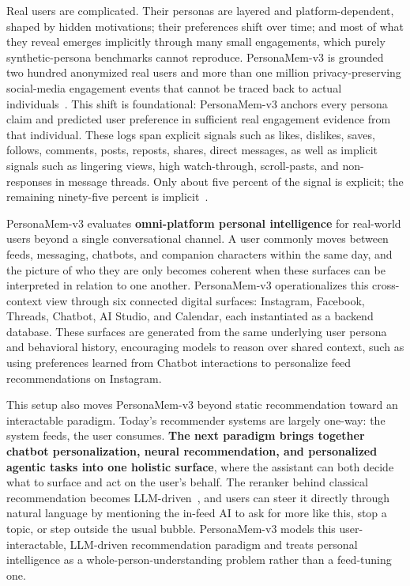 \documentclass[]{fairmeta}
\begin{document}
Real users are complicated. Their personas are layered and platform-dependent, shaped by hidden motivations; their preferences shift over time; and most of what they reveal emerges implicitly through many small engagements, which purely synthetic-persona benchmarks cannot reproduce. PersonaMem-v3 is grounded two hundred anonymized real users and more than one million privacy-preserving social-media engagement events that cannot be traced back to actual individuals~\citep{fostiropoulos2026gistbench}. This shift is foundational: PersonaMem-v3 anchors every persona claim and predicted user preference in sufficient real engagement evidence from that individual. These logs span explicit signals such as likes, dislikes, saves, follows, comments, posts, reposts, shares, direct messages, as well as implicit signals such as lingering views, high watch-through, scroll-pasts, and non-responses in message threads. Only about five percent of the signal is explicit; the remaining ninety-five percent is implicit~\citep{fostiropoulos2026gistbench}.

PersonaMem-v3 evaluates \textbf{omni-platform personal intelligence} for real-world users beyond a single conversational channel. A user commonly moves between feeds, messaging, chatbots, and companion characters within the same day, and the picture of who they are only becomes coherent when these surfaces can be interpreted in relation to one another. PersonaMem-v3 operationalizes this cross-context view through six connected digital surfaces: Instagram, Facebook, Threads, Chatbot, AI Studio, and Calendar, each instantiated as a backend database. These surfaces are generated from the same underlying user persona and behavioral history, encouraging models to reason over shared context, such as using preferences learned from Chatbot interactions to personalize feed recommendations on Instagram. 

This setup also moves PersonaMem-v3 beyond static recommendation toward an interactable paradigm. Today’s recommender systems are largely one-way: the system feeds, the user consumes. \textbf{The next paradigm brings together chatbot personalization, neural recommendation, and personalized agentic tasks into one holistic surface}, where the assistant can both decide what to surface and act on the user’s behalf. The reranker behind classical recommendation becomes LLM-driven~\citep{gao2025llm4rerank, hou2024zeroshotrankers, luo2025recranker, liu2026generating, wang2025userfeedbackalignment, wang2024interestexploration}, and users can steer it directly through natural language by mentioning the in-feed AI to ask for more like this, stop a topic, or step outside the usual bubble. PersonaMem-v3 models this user-interactable, LLM-driven recommendation paradigm and treats personal intelligence as a whole-person-understanding problem rather than a feed-tuning one.
\end{document}
